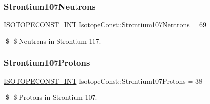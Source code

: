 \subsubsection{\texorpdfstring{Strontium107\+Neutrons}{Strontium107Neutrons}}
{\footnotesize\ttfamily \mbox{\hyperlink{group___isotope_const-_macros_ga5f18360b3e99483a35c32d789e62621c}{I\+S\+O\+T\+O\+P\+E\+C\+O\+N\+S\+T\+\_\+\+I\+NT}} Isotope\+Const\+::\+Strontium107\+Neutrons = 69}

\$ \$ Neutrons in Strontium-\/107. \mbox{\label{group___isotope_const-_strontium-_sr107_ga64c73fe6b17893c3a5f1844fd9244e2f}} 
\subsubsection{\texorpdfstring{Strontium107\+Protons}{Strontium107Protons}}
{\footnotesize\ttfamily \mbox{\hyperlink{group___isotope_const-_macros_ga5f18360b3e99483a35c32d789e62621c}{I\+S\+O\+T\+O\+P\+E\+C\+O\+N\+S\+T\+\_\+\+I\+NT}} Isotope\+Const\+::\+Strontium107\+Protons = 38}

\$ \$ Protons in Strontium-\/107. 